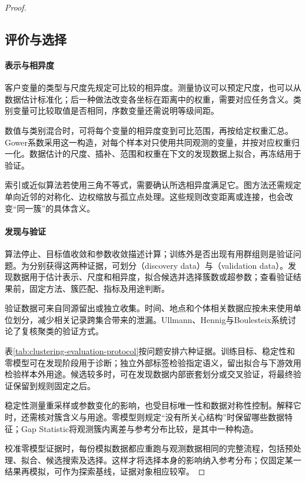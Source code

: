 \begin{proof}
\subsection{评价与选择}

\paragraph{表示与相异度}
客户变量的类型与尺度先规定可比较的相异度。测量协议可以预定尺度，也可以从数据估计标准化；后一种做法改变各坐标在距离中的权重，需要对应任务含义。类别变量可比较取值是否相同，序数变量还需说明等级间距。

数值与类别混合时，可将每个变量的相异度变到可比范围，再按给定权重汇总。Gower系数采用这一构造，对每个样本对只使用共同观测的变量，并按对应权重归一化。数据估计的尺度、插补、范围和权重在下文的发现数据上拟合，再冻结用于验证。

索引或近似算法若使用三角不等式，需要确认所选相异度满足它。图方法还需规定单向近邻的对称化、边权缩放与孤立点处理。这些规则改变距离或连接，也会改变“同一簇”的具体含义。

\paragraph{发现与验证}
算法停止、目标值收敛和参数收敛描述计算；训练外是否出现有用群组则是验证问题。为分别获得这两种证据，可划分（discovery data）与（validation data）。发现数据用于估计表示、尺度和相异度，拟合候选并选择簇数或超参数；查看验证结果前，固定方法、簇匹配、指标及用途判断。

验证数据可来自同源留出或独立收集。时间、地点和个体相关数据应按未来使用单位划分，减少相关记录跨集合带来的泄漏。Ullmann、Hennig与Boulesteix系统讨论了复核聚类的验证方式。

表\ref{tab:clustering-evaluation-protocol}按问题安排六种证据。训练目标、稳定性和零模型可在发现阶段用于诊断；独立外部标签检验指定语义，留出拟合与下游效用检验样本外用途。候选较多时，可在发现数据内部嵌套划分或交叉验证，将最终验证保留到规则固定之后。

稳定性测量重采样或参数变化的影响，也受目标唯一性和数据对称性控制。解释它时，还需核对簇含义与用途。零模型则规定“没有所关心结构”时保留哪些数据特征；Gap Statistic将观测簇内离差与参考分布比较，是其中一种构造。

校准零模型证据时，每份模拟数据都应重跑与观测数据相同的完整流程，包括预处理、拟合、候选搜索及选择。这样才将选择本身的影响纳入参考分布；仅固定某一结果再模拟，可作为探索基线，证据对象相应较窄。


\end{proof}
